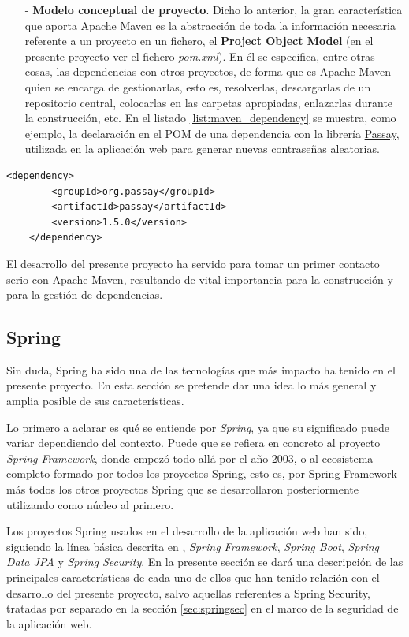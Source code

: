 \documentclass[a4paper,12pt,twoside,openright]{report}
\begin{document}
\begin{itemize}
    	\item[-] \textbf{Modelo conceptual de proyecto}. Dicho lo anterior, la gran característica que aporta Apache Maven es la abstracción de toda la información necesaria referente a un proyecto en un fichero, el \textbf{Project Object Model} (en el presente proyecto ver el fichero \emph{pom.xml}). En él se especifica, entre otras cosas, las dependencias con otros proyectos, de forma que es Apache Maven quien se encarga de gestionarlas, esto es, resolverlas, descargarlas de un repositorio central, colocarlas en las carpetas apropiadas, enlazarlas durante la construcción, etc. En el listado \ref{list:maven_dependency} se muestra, como ejemplo, la declaración en el POM de una dependencia con la librería \href{https://www.passay.org/}{Passay}, utilizada en la aplicación web para generar nuevas contraseñas aleatorias. 
    \end{itemize}
    
    \begin{lstlisting}[caption=Declaración de dependencia en Apache Maven, label=list:maven_dependency]
    <dependency>
	    <groupId>org.passay</groupId>
	    <artifactId>passay</artifactId>
	    <version>1.5.0</version>
    </dependency>
    \end{lstlisting}
    
    El desarrollo del presente proyecto ha servido para tomar un primer contacto serio con Apache Maven, resultando de vital importancia para la construcción y para la gestión de dependencias.
    
    \subsection{Spring} \label{sec:spring}
    Sin duda, Spring ha sido una de las tecnologías que más impacto ha tenido en el presente proyecto. En esta sección se pretende dar una idea lo más general y amplia posible de sus características.
    
    Lo primero a aclarar es qué se entiende por \emph{Spring}, ya que su significado puede variar dependiendo del contexto. Puede que se refiera en concreto al proyecto \emph{Spring Framework}, donde empezó todo allá por el año 2003, o al ecosistema completo formado por todos los \href{https://spring.io/projects}{proyectos Spring}, esto es, por Spring Framework más todos los otros proyectos Spring que se desarrollaron posteriormente utilizando como núcleo al primero.
    
    Los proyectos Spring usados en el desarrollo de la aplicación web han sido, siguiendo la línea básica descrita en \cite{Walls2019}, \emph{Spring Framework}, \emph{Spring Boot}, \emph{Spring Data JPA} y \emph{Spring Security}. En la presente sección se dará una descripción de las principales características de cada uno de ellos que han tenido relación con el desarrollo del presente proyecto, salvo aquellas referentes a Spring Security, tratadas por separado en la sección \ref{sec:springsec} en el marco de la seguridad de la aplicación web.
    
\end{document}
